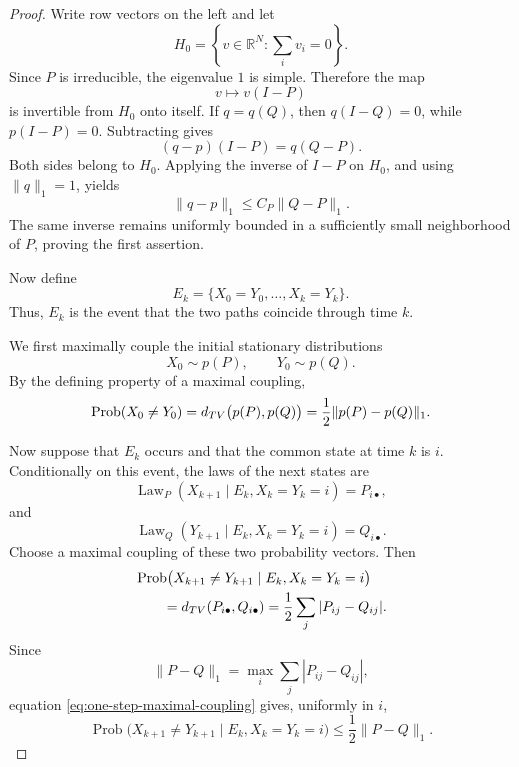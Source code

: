 \documentclass[10pt,a4paper]{amsart}
\newcommand{\Law}{\operatorname{Law}}
\newcommand{\Prob}{\operatorname{Prob}}
\newcommand{\RR}{\mathbb R}
\begin{document}
\begin{proof}
Write row vectors on the left and let
$$
 H_0=\left\{v\in\RR^N:\sum_iv_i=0\right\}.
$$
Since $P$ is irreducible, the eigenvalue $1$ is simple.  Therefore
the map
$$
 v\longmapsto v(I-P)
$$
is invertible from \(H_0\) onto itself.  If $q=q(Q)$, then
$q(I-Q)=0$, while $p(I-P)=0$.  Subtracting gives
\begin{equation}\label{eq:stationary-vector-linearization}
 (q-p)(I-P)=q(Q-P).
\end{equation}
Both sides belong to $H_0$.  Applying the inverse of $I-P$ on
$H_0$, and using $\|q\|_1=1$, yields
\begin{equation}\label{eq:stationary-vector-lipschitz-expanded}
 \|q-p\|_1\le C_P\|Q-P\|_1.
\end{equation}
The same inverse remains uniformly bounded in a sufficiently small
neighborhood of $P$, proving the first assertion.


Now define
$$
 E_k=\{X_0=Y_0,\ldots,X_k=Y_k\}.
$$
Thus, $E_k$ is the event that the two paths coincide through time
$k$.

We first maximally couple the initial stationary distributions
$$
 X_0\sim p(P),
 \qquad
 Y_0\sim p(Q).
$$
By the defining property of a maximal coupling,
\begin{equation}\label{eq:initial-maximal-coupling}
 \Prob(X_0\ne Y_0)
 =
 d_{\rm TV}\bigl(p(P),p(Q)\bigr)
 =
 \frac12\|p(P)-p(Q)\|_1.
\end{equation}

Now suppose that $E_k$ occurs and that the common state at time $k$ is $i$.  Conditionally on this event, the laws of the next states are
$$
 \Law_P(X_{k+1}\mid E_k,X_k=Y_k=i)=P_{i\bullet},
$$
and
$$
 \Law_Q(Y_{k+1}\mid E_k,X_k=Y_k=i)=Q_{i\bullet}.
$$
Choose a maximal coupling of these two probability vectors.  Then
\begin{align}
 &\Prob\bigl(
   X_{k+1}\ne Y_{k+1}
   \mid E_k,X_k=Y_k=i
 \bigr)
 \notag\\
 &\qquad
 =
 d_{\rm TV}(P_{i\bullet},Q_{i\bullet})
 =
 \frac12\sum_j|P_{ij}-Q_{ij}|.
 \label{eq:one-step-maximal-coupling}
\end{align}
Since
$$
 \|P-Q\|_1
 =
 \max_i\sum_j|P_{ij}-Q_{ij}|,
$$
equation \eqref{eq:one-step-maximal-coupling} gives, uniformly in
\(i\),
\begin{equation}\label{eq:one-step-disagreement-bound}
 \Prob\bigl(
   X_{k+1}\ne Y_{k+1}
   \mid E_k,X_k=Y_k=i
 \bigr)
 \le \frac12\|P-Q\|_1.
\end{equation}


\end{proof}
\end{document}
